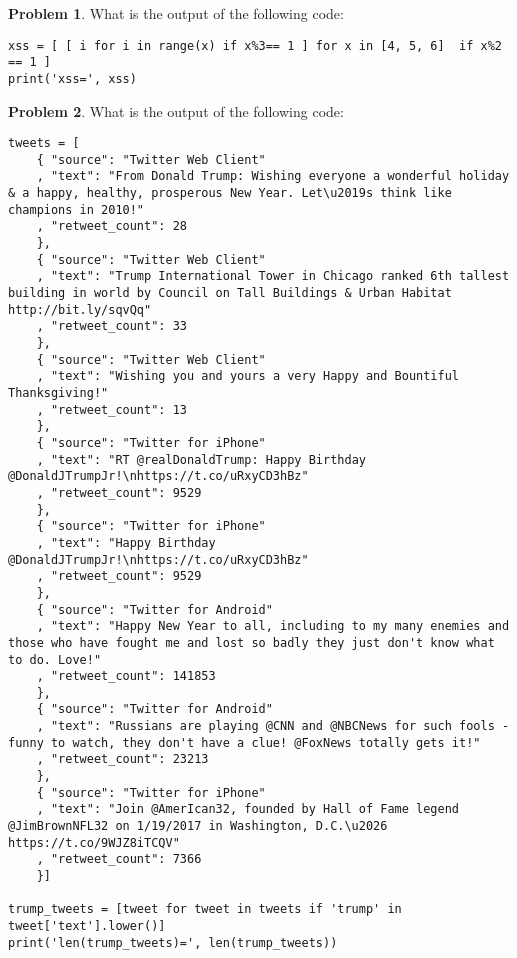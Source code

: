 \documentclass[10pt]{article}
\theoremstyle{definition}
\newtheorem{problem}{Problem}
\begin{document}
\begin{problem}
    What is the output of the following code:
\end{problem}
\begin{lstlisting}
xss = [ [ i for i in range(x) if x%3== 1 ] for x in [4, 5, 6]  if x%2 == 1 ]
print('xss=', xss)
\end{lstlisting}
\vspace{2.0in}







\newpage
\begin{problem}
    What is the output of the following code:
\end{problem}
\begin{lstlisting}
tweets = [
    { "source": "Twitter Web Client"
    , "text": "From Donald Trump: Wishing everyone a wonderful holiday & a happy, healthy, prosperous New Year. Let\u2019s think like champions in 2010!"
    , "retweet_count": 28
    }, 
    { "source": "Twitter Web Client"
    , "text": "Trump International Tower in Chicago ranked 6th tallest building in world by Council on Tall Buildings & Urban Habitat http://bit.ly/sqvQq"
    , "retweet_count": 33
    },
    { "source": "Twitter Web Client"
    , "text": "Wishing you and yours a very Happy and Bountiful Thanksgiving!"
    , "retweet_count": 13
    },
    { "source": "Twitter for iPhone"
    , "text": "RT @realDonaldTrump: Happy Birthday @DonaldJTrumpJr!\nhttps://t.co/uRxyCD3hBz"
    , "retweet_count": 9529
    },
    { "source": "Twitter for iPhone"
    , "text": "Happy Birthday @DonaldJTrumpJr!\nhttps://t.co/uRxyCD3hBz"
    , "retweet_count": 9529
    },
    { "source": "Twitter for Android"
    , "text": "Happy New Year to all, including to my many enemies and those who have fought me and lost so badly they just don't know what to do. Love!"
    , "retweet_count": 141853
    },
    { "source": "Twitter for Android"
    , "text": "Russians are playing @CNN and @NBCNews for such fools - funny to watch, they don't have a clue! @FoxNews totally gets it!"
    , "retweet_count": 23213
    },
    { "source": "Twitter for iPhone"
    , "text": "Join @AmerIcan32, founded by Hall of Fame legend @JimBrownNFL32 on 1/19/2017 in Washington, D.C.\u2026 https://t.co/9WJZ8iTCQV"
    , "retweet_count": 7366
    }]

trump_tweets = [tweet for tweet in tweets if 'trump' in tweet['text'].lower()]
print('len(trump_tweets)=', len(trump_tweets))
\end{lstlisting}
\vspace{1.5in}
\end{document}
